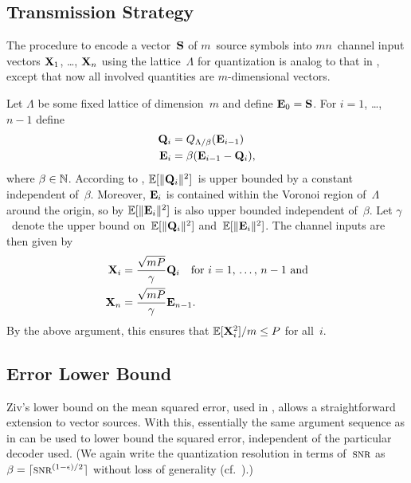 \subsection{Transmission Strategy}

The procedure to encode a vector~$\S$ of $m$~source symbols into $mn$~channel
input vectors $\X_1$, \ldots, $\X_n$ using the lattice~$\Lambda$ for
quantization is analog to that in , except that now all
involved quantities are $m$-dimensional vectors.

Let $\Lambda$ be some fixed lattice of dimension~$m$ and define $\Evc_0 = \S$.
For $i = 1$, \ldots, $n-1$ define
\begin{align}
  \Q_i &= \QLb(\Evc_{i-1})  \nonumber \\
  \Evc_i &= \beta ( \Evc_{i-1} - \Q_i), \label{eq:latticeQE}
\end{align}
where $\beta \in \NN$. According to , $\E[\|\Q_i\|^2]$~is
upper bounded by a constant independent of~$\beta$. Moreover, $\Evc_i$
is contained within the Voronoi region of~$\Lambda$ around the origin, so by
 $\E[\|\Evc_i\|^2]$ is also upper bounded independent
of~$\beta$. Let $\gamma$~denote the upper bound on~$\E[\|\Q_i\|^2]$
and~$\E[\|\Evc_i\|^2]$.  The channel inputs are then given by
\begin{align*}
  \X_i &= \frac{\sqrt{mP}}{\gamma} \Q_i \quad \text{for $i = 1$, \dots, $n-1$
  and} \\
  \X_n &= \frac{\sqrt{mP}}{\gamma} \Evc_{n-1}.
\end{align*}
By the above argument, this ensures that $\E[\X_i^2]/m \le P$ for all~$i$.



\subsection{Error Lower Bound}

Ziv's lower bound on the mean squared error, used in ,
allows a straightforward extension to vector sources. With this, essentially the
same argument sequence as in  can be used to lower bound the
squared error, independent of the particular decoder used.
(We again write the quantization resolution in terms of~$\snr$
as $\beta = \lceil \snr^{(1-\e)/2} \rceil$ without loss of generality
(cf.~).)

